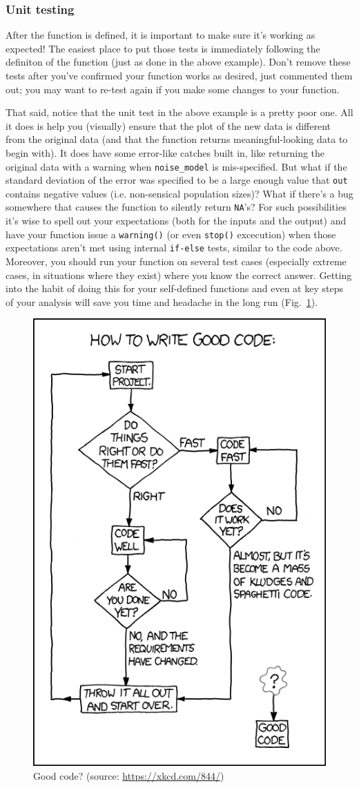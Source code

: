 \documentclass[12pt,letterpaper]{article}
\begin{document}
\subsubsection{Unit testing}
After the function is defined, it is important to make sure it's working as expected!
The easiest place to put those tests is immediately following the definiton of the function (just as 
done in the above example).
Don't remove these tests after you've confirmed your function works as desired, just commented 
them out;
you may want to re-test again if you make some changes to your function.

That said, notice that the unit test in the above example is a pretty poor one.
All it does is help you (visually) ensure that the plot of the new data is 
different from the original data (and that the function returns 
meaningful-looking data to begin with).
It does have some error-like catches built in, like returning the original data with a warning when 
\texttt{noise\_model} is mis-specified.
But what if the standard deviation of the error was specified to be a large enough value that 
\texttt{out} contains negative values (i.e. non-sensical population sizes)?
What if there's a bug somewhere that causes the function to silently return \texttt{NA}'s?
For such possibilities it's wise to spell out your expectations (both for the inputs and the output) and 
have your function issue a \texttt{warning()} (or even \texttt{stop()} excecution) when those 
expectations aren't met using internal \texttt{if-else} tests, similar to the code above.
Moreover, you should run your function on several test cases (especially extreme cases, in situations 
where they exist) where you know the correct answer.
Getting into the habit of doing this for your self-defined functions and even at key steps of your 
analysis will save you time and headache in the long run (Fig.~\ref{fig:goodcode}).

\begin{figure}[H]
	\centering
	\includegraphics[width=0.4\linewidth]{figs/goodcode.png}
	\caption{Good code? (source: \url{https://xkcd.com/844/})}
	\label{fig:goodcode}
\end{figure}
\end{document}
